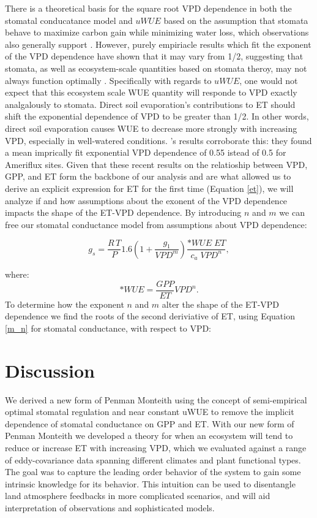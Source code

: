 \documentclass[draft,linenumbers]{agujournal}
\begin{document}
There is a theoretical basis for the square root VPD dependence in both the stomatal conducatance model and $uWUE$ based on the assumption that stomata behave to maximize carbon gain while minimizing water loss, which observations also generally support \citep{Lloyd_1991, MEDLYN_2011, Lin_2015, Zhou_2014, Zhou_2015, Medlyn_2017}. However, purely empiriacle results which fit the exponent of the VPD dependence have shown that it may vary from 1/2, suggesting that stomata, as well as ecosystem-scale quantities based on stomata theroy,  may not always function optimally \citep{Zhou_2015, Lin_2018}. Specifically with regards to $uWUE$, one would not expect that this ecosystem scale WUE quantity will responde to VPD exactly analgalously to stomata. Direct soil evaporation's contributions to ET should shift the exponential dependence of VPD to be greater than 1/2. In other words, direct soil evaporation causes WUE to decrease more strongly with increasing VPD, especially in well-watered conditions. \citet{Zhou_2015}'s results corroborate this: they found a mean imprically fit exponential VPD dependence of 0.55 istead of 0.5 for Ameriflux sites. Given that these recent results on the relatioship between VPD, GPP, and ET form the backbone of our analysis and are what allowed us to derive an explicit expression for ET for the first time (Equation \ref{et}), we will analyze if and how assumptions about the exonent of the VPD dependence impacts the shape of the ET-VPD dependence. By introducing $n$ and $m$ we can free our stomatal conductance model from assumptions about VPD dependence:
\begin{linenomath*}
  \begin{equation}
    g_s = \frac{R \, T}{P} 1.6 \left(1 + \frac{g_1}{VPD^m}\right) \frac{*WUE \; ET}{c_a \; VPD^n},
    \label{m_n}
  \end{equation}
\end{linenomath*}
where:
\[*WUE = \frac{GPP}{ET}VPD^n.\]
To determine how the exponent $n$ and $m$ alter the shape of the ET-VPD dependence we find the roots of the second deriviative of ET, using Equation \ref{m_n} for stomatal conductance, with respect to VPD:




\section{Discussion} 

We derived a new form of Penman Monteith using the concept of semi-empirical optimal stomatal regulation \citep{Lin_2015, MEDLYN_2011} and near constant uWUE \citep{Zhou_2015} to remove the implicit dependence of stomatal conductance on GPP and ET. With our new form of Penman Monteith we developed a theory for when an ecosystem will tend to reduce or increase ET with increasing VPD, which we evaluated against a range of eddy-covariance data spanning different climates and plant functional types. The goal was to capture the leading order behavior of the system to gain some intrinsic knowledge for its behavior. This intuition can be used to disentangle land atmosphere feedbacks in more complicated scenarios, and will aid interpretation of observations and sophisticated models.
\end{document}
